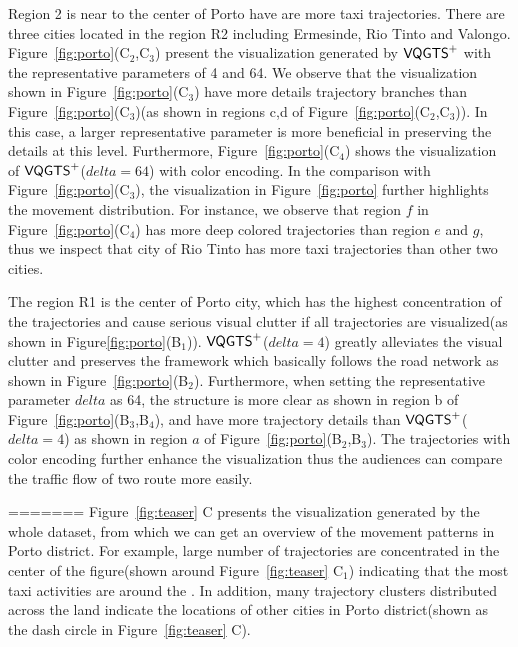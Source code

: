 Region 2 is near to the center of Porto have are more taxi trajectories. There are three cities located in the region R2 including Ermesinde, Rio Tinto and Valongo.  
Figure~\ref{fig:porto}(C$_2$,C$_3$) present the visualization generated by $\mathsf{VQGTS}^{+}$ with the representative parameters of 4 and 64. We observe that the visualization shown in Figure~\ref{fig:porto}(C$_3$) have more details trajectory branches than Figure~\ref{fig:porto}(C$_3$)(as shown in regions c,d of Figure~\ref{fig:porto}(C$_2$,C$_3$)). In this case, a larger representative parameter is more beneficial in preserving the details at this level. Furthermore, Figure~\ref{fig:porto}(C$_4$) shows the visualization of $\mathsf{VQGTS}^{+}$($delta = 64$) with color encoding. In the comparison with Figure~\ref{fig:porto}(C$_3$), the visualization in Figure~\ref{fig:porto} further highlights the movement distribution. 
For instance, we observe that region $f$ in Figure~\ref{fig:porto}(C$_4$) has more deep colored trajectories than region $e$ and $g$, thus we inspect that city of Rio Tinto has more taxi trajectories than other two cities.

The region R1 is the center of Porto city, which has the highest concentration of the trajectories and cause serious visual clutter if all trajectories are visualized(as shown in Figure\ref{fig:porto}(B$_1$)). $\mathsf{VQGTS}^{+}$($delta = 4$) greatly alleviates the visual clutter and preserves the framework which basically follows the road network as shown in Figure~\ref{fig:porto}(B$_2$). Furthermore, when setting the representative parameter $delta$ as 64, the structure is more clear as shown in region b of Figure~\ref{fig:porto}(B$_3$,B$_4$), and have more trajectory details than $\mathsf{VQGTS}^{+}$($delta = 4$) as shown in region $a$ of Figure~\ref{fig:porto}(B$_2$,B$_3$). The trajectories with color encoding further enhance the visualization thus the audiences can compare the traffic flow of two route more easily.   
 
 
=======
Figure~\ref{fig:teaser} C presents the visualization generated by the whole dataset, from which we can get an overview of the movement patterns in Porto district. For example, large number of trajectories are concentrated in the center of the figure(shown around Figure~\ref{fig:teaser} C$_1$) indicating that the most taxi activities are around the . In addition,
many trajectory clusters distributed across the land indicate the locations of other cities in Porto district(shown as the dash circle in Figure~\ref{fig:teaser} C).

